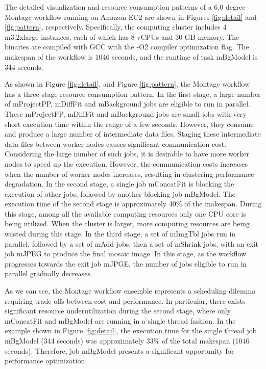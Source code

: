 The detailed visualization and  resource consumption patterns of a 6.0 degree Montage workflow running on Amazon EC2 are shown in Figures \ref{fig:detail} and \ref{fig:pattern}, respectively. Specifically, the computing cluster includes 4 m3.2xlarge instances, each of which has 8 vCPUs and 30 GB memory. The binaries are compiled with GCC with the -O2 compiler optimization flag. The makespan of the workflow is 1046 seconds, and the runtime of task mBgModel is 344 seconds. 


As shown in Figure  \ref{fig:detail}, and Figure \ref{fig:pattern}, the Montage workflow has a three-stage resource consumption pattern. In the first stage, a large number of mProjectPP, mDiffFit and mBackground jobs are eligible to run in parallel. These mProjectPP, mDiffFit and mBackground jobs are small jobs with very short execution time within the range of a few seconds. However, they consume and produce a large number of intermediate data files. Staging these intermediate data files between worker nodes causes significant communication cost. Considering the large number of such jobs, it is desirable to have more worker nodes to speed up the execution. However, the communication costs increases when the number of worker nodes increases, resulting in clustering performance degradation. In the second stage, a single job mConcatFit is blocking the execution of other jobs, followed by another blocking job mBgModel. The execution time of the second stage is approximately 40\% of the makespan. During this stage, among all the available computing resources only one CPU core is being utilized. When the cluster is larger, more computing resources are being wasted during this stage. In the third stage, a set of mImgTbl jobs run in parallel, followed by a set of mAdd jobs, then a set of mShrink jobs, with an exit job mJPEG to produce the final mosaic image. In this stage, as the workflow progresses towards the exit job mJPGE, the number of jobs eligible to run in parallel gradually decreases. 

As we can see, the Montage workflow ensemble represents a scheduling dilemma requiring trade-offs between cost and performance. In particular, there exists significant resource underutilization during the second stage, where only mConcatFit and mBgModel are running in a single thread fashion. In the example shown in Figure \ref{fig:detail}, the execution time for the single thread job mBgModel (344 seconds) was approximately 33\% of the total makespan (1046 seconds). Therefore, job mBgModel presents a significant opportunity for performance optimization. 


